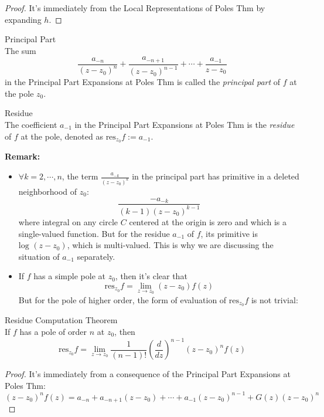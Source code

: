 \begin{proof}
    It's immediately from the Local Representations of Poles Thm by expanding $h$.
\end{proof}

\begin{definition}{Principal Part}\\
The sum
\[
\frac{a_{-n}}{(z-z_0)^n} +\frac{a_{-n+1}}{(z-z_0)^{n-1}} +\cdots+ \frac{a_{-1}}{z-z_0}
\]
in the Principal Part Expansions at Poles Thm is called the \textit{principal part} of $f$ at the pole $z_0$.
\end{definition}

\begin{definition}{Residue}\\
The coefficient $a_{-1}$ in the Principal Part Expansions at Poles Thm is the \textit{residue} of $f$ at the pole, denoted as $\text{res}_{z_0} f:=a_{-1}$.
\end{definition}

\noindent\textbf{Remark:} \begin{itemize}
    \item $\forall k=2,\cdots, n$, the term $\frac{a_{-k}}{(z-z_0)^{k}}$ in the principal part has primitive in a deleted neighborhood of $z_0$:
    \[
    \frac{-a_{-k}}{(k-1)(z-z_0)^{k-1}}
    \]
    where integral on any circle $C$ centered at the origin is zero and which is a single-valued function. But for the residue $a_{-1}$ of $f$, its primitive is $\text{log } (z-z_0)$, which is multi-valued. This is why we are discussing the situation of $a_{-1}$ separately.

    \item If $f$ has a simple pole at $z_0$, then it's clear that
    \[
    \text{res}_{z_0}f= \lim_{z\to z_0} (z-z_0)f(z)
    \]
    But for the pole of higher order, the form of evaluation of $\text{res}_{z_0}f$ is not trivial:
\end{itemize}

\begin{theorem}{Residue Computation Theorem}\\
If $f$ has a pole of order $n$ at $z_0$, then
\[
\text{res}_{z_0}f= \lim_{z\to z_0} \frac{1}{(n-1)!} (\frac{d}{dz})^{n-1} (z-z_0)^n f(z)
\]
\end{theorem}

\begin{proof}
    It's immediately from a consequence of the Principal Part Expansions at Poles Thm:
    \[
    (z-z_0)^n f(z)= a_{-n} +a_{-n+1} (z-z_0) +\cdots+ a_{-1} (z-z_0)^{n-1}+ G(z)(z-z_0)^n
    \]
\end{proof}

